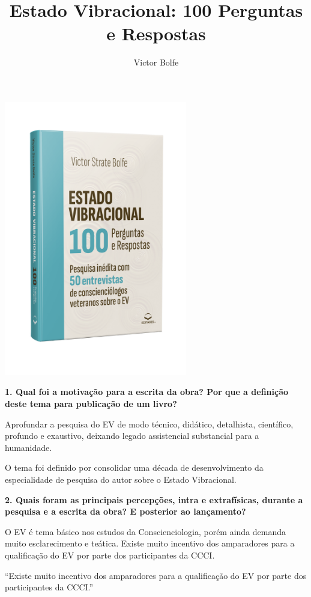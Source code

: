 \documentclass{gescons}
\author{Victor Bolfe}
\title{Estado Vibracional: 100 Perguntas e Respostas}
\begin{document}
    \makeentrevistatitle

    \begin{multicols}{2}


\begin{center}
    \includegraphics[width=8cm]{articles/entrevista/mockups/Victor-Bolfe.png}
\end{center}

\textbf{1. Qual foi a motivação para a escrita da obra? Por que a definição deste tema para publicação de um livro?}

Aprofundar a pesquisa do EV de modo técnico, didático, detalhista, científico, profundo e exaustivo, deixando legado assistencial substancial para a humanidade. 

O tema foi definido por consolidar uma década de desenvolvimento da especialidade de pesquisa do autor sobre o Estado Vibracional. 

\textbf{2. Quais foram as principais percepções, intra e extrafísicas, durante a pesquisa e a escrita da obra? E posterior ao lançamento?}

O EV é tema básico nos estudos da Conscienciologia, porém ainda demanda muito esclarecimento e teática. Existe muito incentivo dos amparadores para a qualificação do EV por parte dos participantes da CCCI. 

\begin{pullquote}
    ``Existe muito incentivo dos amparadores para a qualificação do EV por parte dos participantes da CCCI.''
\end{pullquote}



\end{multicols}
\end{document}
